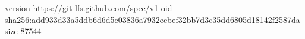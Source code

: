 version https://git-lfs.github.com/spec/v1
oid sha256:add933d33a5ddb6d6d5e03836a7932ecbef32bb7d3c35dd6805d18142f2587da
size 87544
